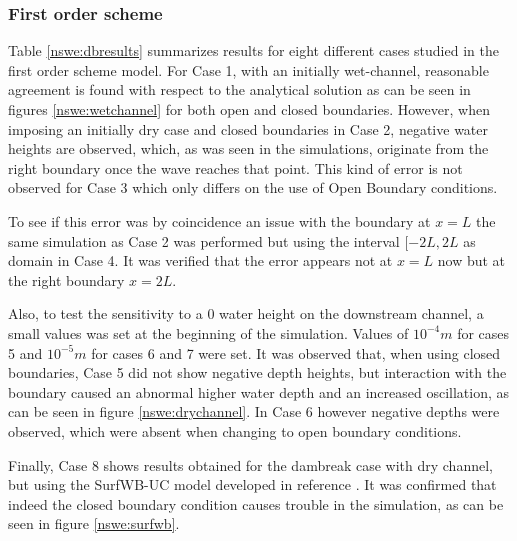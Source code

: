 	\subsubsection{First order scheme}

	Table \ref{nswe:dbresults} summarizes results for eight different cases studied in the first order scheme model. For Case 1, with an initially wet-channel, reasonable agreement is found with respect to the analytical solution as can be seen in figures \ref{nswe:wetchannel} for both open and closed boundaries. However, when imposing an initially dry case and closed boundaries in Case 2, negative water heights are observed, which, as was seen in the simulations, originate from the right boundary once the wave reaches that point. This kind of error is not observed for Case 3 which only differs on the use of Open Boundary conditions.

	To see if this error was by coincidence an issue with the boundary at $x=L$ the same simulation as Case 2 was performed but using the interval $[-2L,2L$ as domain in Case 4. It was verified that the error appears not at $x=L$ now but at the right boundary $x=2L$.

	Also, to test the sensitivity to a 0 water height on the downstream channel, a small values was set at the beginning of the simulation. Values of $10^{-4}m$ for cases 5 and $10^{-5}m$ for cases 6 and 7 were set. It was observed that, when using closed boundaries, Case 5 did not show negative depth heights, but interaction with the boundary caused an abnormal higher water depth and an increased oscillation, as can be seen in figure \ref{nswe:drychannel}. In Case 6 however negative depths were observed, which were absent when changing to open boundary conditions.

	Finally, Case 8 shows results obtained for the dambreak case with dry channel, but using the SurfWB-UC model developed in reference \cite{guerra2014}. It was confirmed that indeed the closed boundary condition causes trouble in the simulation, as can be seen in figure \ref{nswe:surfwb}.

